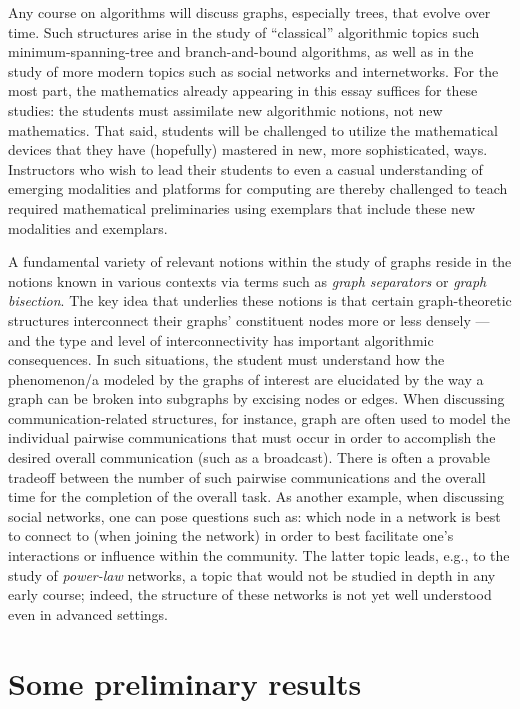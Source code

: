 Any course on algorithms will discuss graphs, especially trees, that
evolve over time.  Such structures arise in the study of ``classical''
algorithmic topics such minimum-spanning-tree and branch-and-bound
algorithms, as well as in the study of more modern topics such as
social networks and internetworks.  For the most part, the mathematics
already appearing in this essay suffices for these studies: the students
must assimilate new algorithmic notions, not new mathematics.  That
said, students will be challenged to utilize the mathematical devices
that they have (hopefully) mastered in new, more sophisticated, ways.
Instructors who wish to lead their students to even a casual
understanding of emerging modalities and platforms for computing are
thereby challenged to teach required mathematical preliminaries using
exemplars that include these new modalities and exemplars.

A fundamental variety of relevant notions within the study of graphs
reside in the notions known in various contexts via terms such as {\em
  graph separators} or {\em graph bisection}.  The key idea that
underlies these notions is that certain graph-theoretic structures
interconnect their graphs' constituent nodes more or less densely ---
and the type and level of interconnectivity has important algorithmic
consequences.  In such situations, the student must understand how the
phenomenon/a modeled by the graphs of interest are elucidated by the
way a graph can be broken into subgraphs by excising nodes or edges.
When discussing communication-related structures, for instance, graph
are often used to model the individual pairwise communications that
must occur in order to accomplish the desired overall communication
(such as a broadcast).  There is often a provable tradeoff between the
number of such pairwise communications and the overall time for the
completion of the overall task.  As another example, when discussing
social networks, one can pose questions such as: which node in a
network is best to connect to (when joining the network) in order to
best facilitate one's interactions or influence within the community.
The latter topic leads, e.g., to the study of {\em power-law}
networks, a topic that would not be studied in depth in any early
course; indeed, the structure of these networks is not yet well
understood even in advanced settings.






\section{Some preliminary results}

